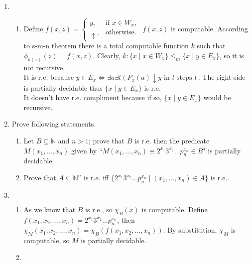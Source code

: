 \documentclass[12pt,a4paper]{article}
\makeatletter
\newtheorem*{solution}{Solution}
\theoremstyle{definition}
\numberwithin{equation}{section}
\numberwithin{figure}{section}
\renewenvironment{solution}[1][Solution] {\par\pushQED{\qed}\normalfont\topsep6\p@\@plus6\p@\relax\trivlist\item[\hskip\labelsep\bfseries#1\@addpunct{.}]\ignorespaces}{\popQED\endtrivlist\@endpefalse} \makeatother
\makeatother
\begin{document}
\begin{enumerate}
\begin{solution}
\begin{enumerate}
  \item Define $f(x,z)=\left\{\begin{array}{ll}
         y, & \mbox{if }x\in W_x,\\
         \uparrow, & \mbox{otherwise}.
      \end{array}\right.$ $f(x,z)$ is computable. According to s-m-n theorem there is a total computable function $k$ such that $\phi_{k(x)}(z)=f(x,z)$. Clearly, $k:\{x\mid x\in W_x\}\leq_m \{x \mid y\in E_x\}$, so it is not recursive.\\
      It is r.e. because $y\in E_x\Leftrightarrow\exists a\exists t(P_x(a)\downarrow y \mbox{ in } t \mbox{ steps})$. The right side is partially decidable thus $\{x \mid y\in E_x\}$ is r.e.\\
      It doesn't have r.e. compliment because if so, $\{x \mid y\in E_x\}$ would be recursive.
  \end{enumerate}
  \end{solution}

\item Prove following statements.
\begin{enumerate}
\item Let $B\subseteq\mathbb{N}$ and $n>1$; prove that $B$ is r.e. then the predicate $M(x_1,\ldots,x_n)$ given by ``$M(x_1,\ldots,x_n)\equiv2^{x_1}3^{x_2}\ldots p_n^{x_n}\in B$" is partially decidable.
\item Prove that $A\subseteq\mathbb{N}^n$ is r.e. iff $\{2^{x_1}3^{x_2}\ldots p_n^{x_n} \mid (x_1,\ldots,x_n)\in A\}$ is r.e..
\end{enumerate}
\begin{solution}
$ $
\begin{enumerate}
\item As we know that $B$ is r.e., so $\chi_B(x)$ is computable. Define $f(x_1,x_2,\ldots,x_n)=2^{x_1}3^{x_2}\ldots p_n^{x_n}$, then \\ $\chi_M(x_1,x_2,\ldots,x_n)=\chi_B(f(x_1,x_2,\ldots,x_n))$. By substitution, $\chi_M$ is computable, so $M$ is partially decidable.
\item 
\end{enumerate}
\end{solution}
\end{enumerate}
\end{document}
